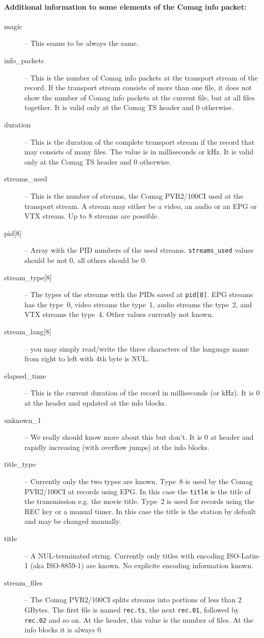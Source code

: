 \documentclass{scrartcl}
\newcommand*{\Comag}{Comag PVR2/100CI\xspace}
\begin{document}
\paragraph{Additional information to some elements of the Comag info packet:}
\begin{description}
\item[magic] -- This seams to be always the same.
\item[info\_packets] -- This is the number of Comag info packets at the
  transport stream of the record. If the transport stream consists of more
  than one file, it does not show the number of Comag info packets at the
  current file, but at all files together. It is valid only at the Comag TS
  header and 0 otherwise.
\item[duration] -- This is the duration of the complete transport stream if
  the record that may consists of many files. The value is in milliseconds or
  kHz.  It is valid only at the Comag TS header and 0 otherwise.
\item[streams\_used] -- This is the number of streams, the \Comag used at the
  transport stream. A stream may either be a video, an audio or an EPG or VTX
  stream. Up to 8 streams are possible.
\item[{pid[8]}] -- Array with the PID numbers of the used
  streams. \texttt{streams\_used} values should be not 0, all others should be
  0.
\item[{stream\_type[8]}] -- The types of the streams with the PIDs saved at
  \texttt{pid[8]}. EPG streams has the type~0, video streams the type~1, audio
  streams the type~2, and VTX streams the type~4. Other values currently not
  known.
\item[{stream\_lang[8]}] -- you may simply read/write the three characters of
  the language name from right to left with 4th byte is NUL.
\item[elapsed\_time] -- This is the current duration of the record in
  milliseconds (or kHz). It is 0 at the header and updated at the info blocks.
\item[unknown\_1] -- We really should know more about this but don't. It is 0
  at header and rapidly increasing (with overflow jumps) at the info blocks.
\item[title\_type] -- Currently only the two types are known. Type~8 is used
  by the \Comag at records using EPG. In this case the \texttt{title} is the
  title of the transmission e.g. the movie title. Type~2 is used for records
  using the REC key or a manual timer. In this case the title is the station
  by default and may be changed manually.
\item[title] -- A NUL-terminated string.  Currently only titles with encoding
  ISO-Latin-1 (aka ISO-8859-1) are known.  No explicite encoding information
  known.
\item[stream\_files] -- The \Comag splits streams into portions of less than
  2\,GBytes. The first file is named \texttt{rec.ts}, the next
  \texttt{rec.01}, followed by \texttt{rec.02} and so on. At the header, this
  value is the number of files. At the info blocks it is always 0.
\end{description}
\end{document}
